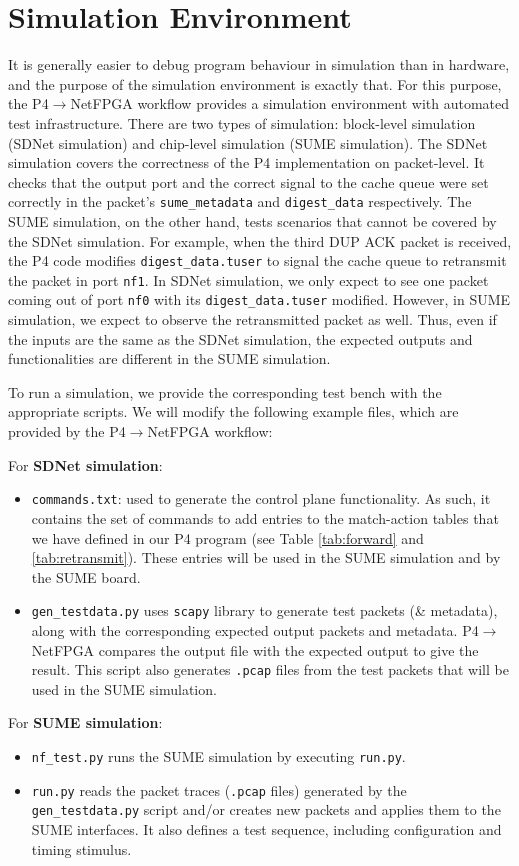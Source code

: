 \section{Simulation Environment}
\label{sec:sim}
It is generally easier to debug program behaviour in simulation than in hardware, and the purpose of the simulation environment is exactly that. For this purpose, the P4$\rightarrow$NetFPGA workflow provides a simulation environment with automated test infrastructure. There are two types of simulation: block-level simulation (SDNet simulation) and chip-level simulation (SUME simulation). The SDNet simulation covers the correctness of the P4 implementation on packet-level. It checks that the output port and the correct signal to the cache queue were set correctly in the packet's \verb|sume_metadata| and \verb|digest_data| respectively. The SUME simulation, on the other hand, tests scenarios that cannot be covered by the SDNet simulation. For example, when the third DUP ACK packet is received, the P4 code modifies \verb|digest_data.tuser| to signal the cache queue to retransmit the packet in port \verb|nf1|. In SDNet simulation, we only expect to see one packet coming out of port \verb|nf0| with its \verb|digest_data.tuser| modified. However, in SUME simulation, we expect to observe the retransmitted packet as well. Thus, even if the inputs are the same as the SDNet simulation, the expected outputs and functionalities are different in the SUME simulation.

To run a simulation, we provide the corresponding test bench with the appropriate scripts. We will modify the following example files, which are provided by the P4$\rightarrow$NetFPGA workflow:

For \textbf{SDNet simulation}:
\begin{itemize}[leftmargin=*, noitemsep]
	\item \texttt{commands.txt}: used to generate the control plane functionality. As such, it contains the set of commands to add entries to the match-action tables that we have defined in our P4 program (see Table \ref{tab:forward} and \ref{tab:retransmit}). These entries will be used in the SUME simulation and by the SUME board.
	\item \texttt{gen\_testdata.py} uses \verb|scapy| library to generate test packets (\& metadata), along with the corresponding expected output packets and metadata. P4$\rightarrow$NetFPGA compares the output file with the expected output to give the result. This script also generates \verb|.pcap| files from the test packets that will be used in the SUME simulation.
\end{itemize}
For \textbf{SUME simulation}:
\begin{itemize}[leftmargin=*, noitemsep]
	\item \texttt{nf\_test.py} runs the SUME simulation by executing \texttt{run.py}.
	\item \texttt{run.py} reads the packet traces (\verb|.pcap| files) generated by the \texttt{gen\_testdata.py} script and/or creates new packets and applies them to the SUME interfaces. It also defines a test sequence, including configuration and timing stimulus.
\end{itemize}

